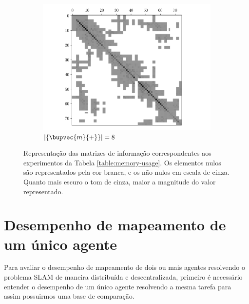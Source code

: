 \begin{figure}
\begin{subfigure}{0.49\textwidth}
    \includegraphics[width=\textwidth]{figs/seif-8-info-matrix.pdf} 
    \caption{$\lvert\{ \bupvec{m}{+} \}\rvert = 8$}
    \label{fig:seif-info-matrix-08}
  \end{subfigure}
  \caption[Matrizes de informação resultantes de diferentes valores de cardinalidade do conjunto de \textit{landmarks} ativas]{Representação das matrizes de informação correspondentes aos experimentos da Tabela \ref{table:memory-usage}. Os elementos nulos são representados pela cor branca, e os não nulos em escala de cinza. Quanto mais escuro o tom de cinza, maior a magnitude do valor representado.}
  \label{fig:seif-info-matrix-memory}
\end{figure}


\section{Desempenho de mapeamento de um único agente}
\label{sec:exp-single-robot}
Para avaliar o desempenho de mapeamento de dois ou mais agentes 
resolvendo o problema SLAM de maneira distribuída e descentralizada, 
primeiro é necessário entender o desempenho de um único agente 
resolvendo a mesma tarefa para assim possuirmos uma base de comparação.

